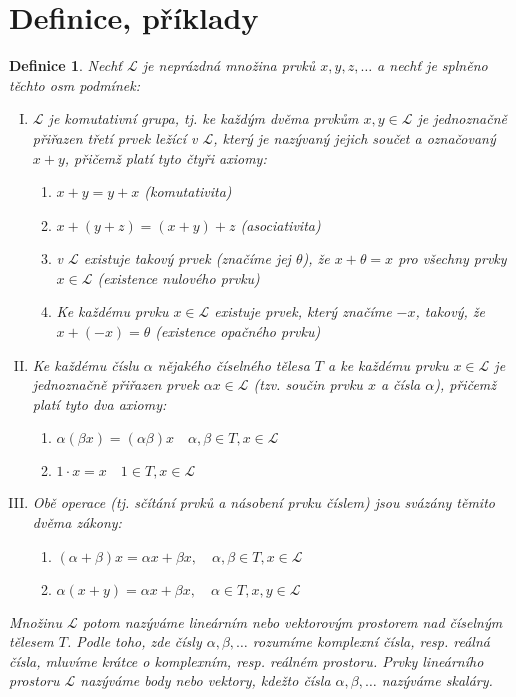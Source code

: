 \documentclass[a4paper, 11pt]{report}
\newtheorem{mydef}{Definice}[chapter]
\begin{document}
\section{Definice, příklady}

\begin{mydef}
Nechť $\mathcal{L}$ je neprázdná množina prvků $x, y, z, \dots$ a nechť je splněno těchto osm podmínek:
\begin{enumerate}[I.]
	\item $\mathcal{L}$ je komutativní grupa, tj. ke každým dvěma prvkům $x, y \in \mathcal{L}$ je jednoznačně přiřazen třetí prvek ležící v $\mathcal{L}$, který je nazývaný jejich součet a označovaný $x + y$, přičemž platí tyto čtyři axiomy:
	\begin{enumerate}[1.]
		\item $x + y = y + x$ (komutativita)
		\item $x + (y + z) = (x + y) + z$ (asociativita)
		\item v $\mathcal{L}$ existuje takový prvek (značíme jej $\theta$), že $x + \theta = x$ pro všechny prvky $x \in \mathcal{L}$ (existence nulového prvku)
		\item Ke každému prvku $x \in \mathcal{L}$ existuje prvek, který značíme $-x$, takový, že $x + (-x) = \theta$ (existence opačného prvku)
	\end{enumerate}
	\item Ke každému číslu $\alpha$ nějakého číselného tělesa $T$ a ke každému prvku $x \in \mathcal{L}$ je jednoznačně přiřazen prvek $\alpha x \in \mathcal{L}$ (tzv. součin prvku $x$ a čísla $\alpha$), přičemž platí tyto dva axiomy:
	\begin{enumerate}[1.]
		\item $\alpha(\beta x) = (\alpha \beta) x \quad \alpha, \beta \in T, x \in \mathcal{L}$
		\item $1 \cdot x = x \quad 1 \in T, x \in \mathcal{L}$
	\end{enumerate}
	\item Obě operace (tj. sčítání prvků a násobení prvku číslem) jsou svázány těmito dvěma zákony:
	\begin{enumerate}[1.]
		\item $(\alpha + \beta) x = \alpha x + \beta x, \quad \alpha, \beta \in T, x \in \mathcal{L}$
		\item $\alpha (x + y) = \alpha x + \beta x, \quad \alpha \in T, x, y \in \mathcal{L}$
	\end{enumerate}
\end{enumerate}
Množinu $\mathcal{L}$ potom nazýváme \emph{lineárním nebo vektorovým prostorem} nad číselným tělesem $T$. Podle toho, zde čísly $\alpha, \beta, \dots$ rozumíme komplexní čísla, resp. reálná čísla, mluvíme krátce o \emph{komplexním}, resp. \emph{reálném prostoru}. Prvky lineárního prostoru $\mathcal{L}$ nazýváme \emph{body} nebo \emph{vektory}, kdežto čísla $\alpha, \beta, \dots$ nazýváme \emph{skaláry}.
\end{mydef}
\end{document}
